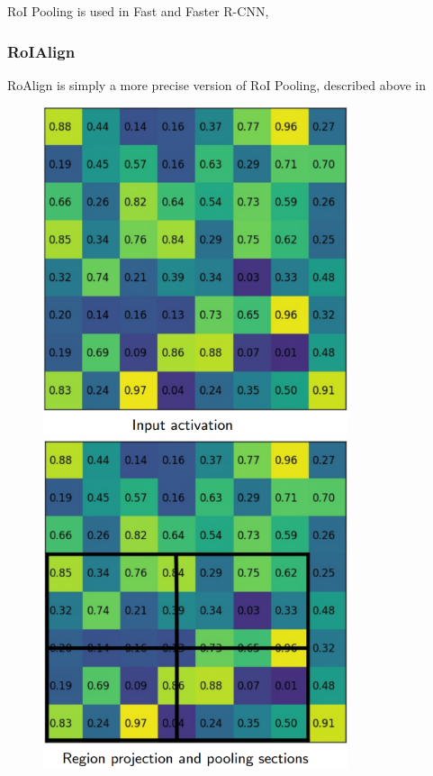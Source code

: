 RoI Pooling is used in Fast \cite{Girshick_2015} and Faster R-CNN, 
\pagebreak
\subsubsection{RoIAlign}\label{s:roi-align}
RoAlign is simply a more precise version of RoI Pooling, described above in 

\begin{figure}[H]
	\centering
	\begin{minipage}{0.5\textwidth}
		\centering
		\includegraphics[width=0.8\textwidth]{images/roialign1.PNG} %
	\end{minipage}\hfill
	\begin{minipage}{0.5\textwidth}
		\centering
		\includegraphics[width=0.8\textwidth]{images/roialign2.PNG} %
	\end{minipage}
\end{figure}

